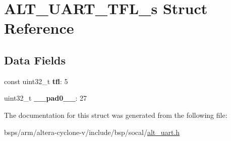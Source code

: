 \hypertarget{structALT__UART__TFL__s}{}\section{A\+L\+T\+\_\+\+U\+A\+R\+T\+\_\+\+T\+F\+L\+\_\+s Struct Reference}
\label{structALT__UART__TFL__s}
\subsection*{Data Fields}
\begin{DoxyCompactItemize}
\item 
\mbox{\label{structALT__UART__TFL__s_a1a8115cc8091422f6c6a067ece1b9491}} 
const uint32\+\_\+t {\bfseries tfl}\+: 5
\item 
\mbox{\label{structALT__UART__TFL__s_a835510bf38776ed4765801eebcb3a656}} 
uint32\+\_\+t {\bfseries \+\_\+\+\_\+pad0\+\_\+\+\_\+}\+: 27
\end{DoxyCompactItemize}


The documentation for this struct was generated from the following file\+:\begin{DoxyCompactItemize}
\item 
bsps/arm/altera-\/cyclone-\/v/include/bsp/socal/\mbox{\hyperlink{alt__uart_8h}{alt\+\_\+uart.\+h}}\end{DoxyCompactItemize}
